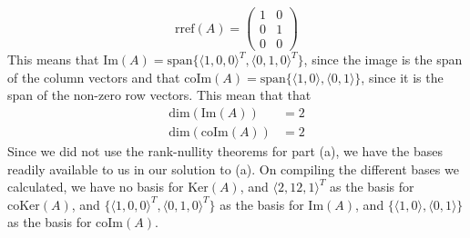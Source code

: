 \documentclass{article}
\begin{document}
\begin{equation*}
    \text{rref}(A) = \begin{pmatrix}
        1 & 0\\
        0 & 1\\
        0 & 0
    \end{pmatrix}
\end{equation*}
This means that $\text{Im}(A) = \text{span}\{\langle 1, 0, 0 \rangle^{T}, \langle 0, 1, 0\rangle^{T}\}$, since the image is the span of the column vectors and that $\text{coIm}(A) = \text{span}\{\langle 1, 0\rangle, \langle 0, 1\rangle \}$, since it is the span of the non-zero row vectors. This mean that that 
\begin{align*}
    \text{dim}(\text{Im}(A)) &= 2\\
    \text{dim}(\text{coIm}(A)) &= 2
\end{align*}
 Since we did not use the rank-nullity theorems for part (a), we have the bases readily available to us in our solution to (a). On compiling the different bases we calculated, we have no basis for $\text{Ker}(A)$, and $\langle 2, 12, 1 \rangle^{T}$ as the basis for $\text{coKer}(A)$, and $\{\langle 1, 0, 0 \rangle^{T}, \langle 0, 1, 0\rangle^{T}\}$ as the basis for $\text{Im}(A)$, and $\{\langle 1,0 \rangle, \langle 0, 1\rangle\}$ as the basis for $\text{coIm}(A)$. 
\end{document}
